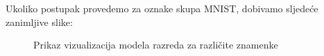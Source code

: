 Ukoliko postupak provedemo za oznake skupa MNIST, dobivamo sljedeće zanimljive slike:

\begin{figure}[H]
	\centering
	\qquad
	\qquad
	\qquad
	\caption{Prikaz vizualizacija modela razreda za različite znamenke}%
	\label{fig:fgsm}
\end{figure}
